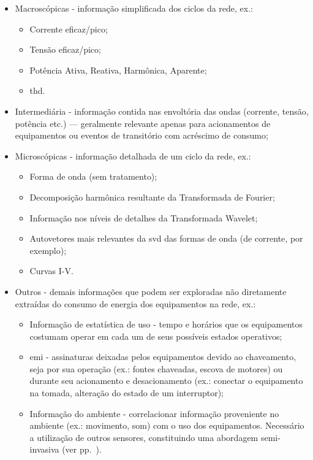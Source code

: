 \begin{itemize}
\item Macroscópicas - informação simplificada dos ciclos da rede, ex.:
\begin{itemize}
\item Corrente eficaz/pico;
\item Tensão eficaz/pico;
\item Potência Ativa, Reativa, Harmônica, Aparente;
\item \gls{thd}.
\end{itemize}
\item Intermediária - informação contida nas envoltória das ondas
(corrente, tensão, potência etc.) --- geralmente relevante apenas para
acionamentos de equipamentos ou eventos de transitório com acréscimo
de consumo;
\item Microscópicas - informação detalhada de um ciclo da rede, ex.:
\begin{itemize}
\item Forma de onda (sem tratamento);
\item Decomposição harmônica resultante da Transformada de Fourier;
\item Informação nos níveis de detalhes da Transformada Wavelet;
\item Autovetores mais relevantes da \gls{svd} das formas de onda (de
corrente, por exemplo);
\item Curvas I-V.
\end{itemize}
\item Outros - demais informações que podem ser exploradas não
diretamente extraídas do consumo de energia dos equipamentos na rede,
ex.:
\begin{itemize}
\item Informação de estatística de uso - tempo e horários que os
equipamentos costumam operar em cada um de seus possíveis estados
operativos;
\item \gls{emi} - assinaturas deixadas pelos equipamentos devido ao
chaveamento, seja por sua operação (ex.: fontes chaveadas, escova de
motores) ou durante seu acionamento e desacionamento (ex.: conectar o
equipamento na tomada, alteração do estado de um interruptor);
\item Informação do ambiente - correlacionar informação proveniente no
ambiente (ex.: movimento, som) com o uso dos equipamentos. Necessário a
utilização de outros sensores, constituindo uma abordagem
semi-invasiva (ver pp.~\pageref{top:seminilm}).
\end{itemize}
\end{itemize}

